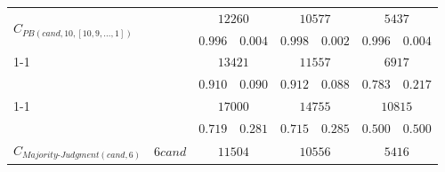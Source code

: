 \begin{table}[h]
\begin{tabular}{|l|c|cccccc|}
        \multirow{2}{*}{$C_{PB(cand, 10, [10,9,\dots, 1])}$}                                                                                          &                                            & \multicolumn{2}{c|}{$12260$}                                     & \multicolumn{2}{c|}{$10577$}           & \multicolumn{2}{c|}{$5437$}      \\
                                                                                                                                                      &                                            & $0.996$              & \multicolumn{1}{c|}{$0.004$}              & $0.998$ & \multicolumn{1}{c|}{$0.002$} & $0.996$         & $0.004$        \\ \cline{1-1} \cline{3-8} 
        \multirow{2}{*}{$C_{PB(cand, cand, [cand,cand-1,\dots, 1])}$\cref{footnote:votEncLinearInBallotEntries}}                                      &                                            & \multicolumn{2}{c|}{$13421$}                                     & \multicolumn{2}{c|}{$11557$}           & \multicolumn{2}{c|}{$6917$}      \\
                                                                                                                                                      &                                            & $0.910$              & \multicolumn{1}{c|}{$0.090$}              & $0.912$ & \multicolumn{1}{c|}{$0.088$} & $0.783$         & $0.217$        \\ \cline{1-1} \cline{3-8} 
        \multirow{2}{*}{$C_{BTS(cand, 2, 1)}$\cref{footnote:votEncLinearInBallotEntries}}                                                             &                                            & \multicolumn{2}{c|}{$17000$}                                     & \multicolumn{2}{c|}{$14755$}           & \multicolumn{2}{c|}{$10815$}     \\
                                                                                                                                                      &                                            & $0.719$              & \multicolumn{1}{c|}{$0.281$}              & $0.715$ & \multicolumn{1}{c|}{$0.285$} & $0.500$         & $0.500$        \\ \hline\hline
        \multirow{2}{*}{$C_{Majority\text{-}Judgment(cand, 6)}$}                                                                                      & \multirow{2}{*}{$6cand$}                   & \multicolumn{2}{c|}{$11504$}                                     & \multicolumn{2}{c|}{$10556$}           & \multicolumn{2}{c|}{$5416$}      \\

\end{tabular}
\end{table}
